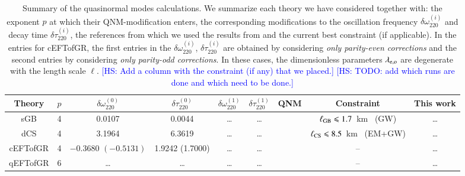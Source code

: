 \documentclass[twocolumn,prd,aps,superscriptaddress,preprintnumbers,tightenlines,showpacs,nofootinbib,eqsecnum,amsfonts,amsmath,longbibliography]{revtex4-1}
\newcommand{\hs}[1]{{\textcolor{blue}{{[HS: #1]}} }}
\begin{document}
\begin{table}[th]
\begin{tabular}{c | c c c c c c c c}
\hline
\hline
Theory & $p$ & $\delta \omega^{(0)}_{220}$ & $\delta \tau^{(0)}_{220}$ & $\delta \omega^{(1)}_{220}$ & $\delta \tau^{(1)}_{220}$ & QNM & Constraint & This work \\
\hline
sGB      & 4 & 0.0107 & 0.0044 & \dots & \dots &  \cite{Pierini:2021jxd} & $\ell_{\rm GB} \leqslant 1.7$~km~\cite{Perkins:2021mhb} (GW) & \dots \\
dCS      & 4 & 3.1964 & 6.3619 & \dots & \dots &  \cite{Wagle:2021tam}   & $\ell_{\rm CS} \leqslant 8.5$~km~\cite{Silva:2020acr} (EM+GW)  & \dots \\
cEFTofGR & 4 & $-0.3680$ $(-0.5131)$  & 1.9242 (1.7000) & \dots & \dots & \cite{Cano:2021myl} & --  & \dots \\
qEFTofGR & 6 & \dots & \dots & \dots & \dots & \cite{Cano:2021myl} & --  & \dots \\
\hline
\hline
\end{tabular}
\caption{Summary of the quasinormal modes calculations.
%
We summarize each theory we have considered together with: the exponent $p$ at
which their QNM-modification enters, the corresponding modifications to the
oscillation frequency $\delta \omega^{(i)}_{220}$ and decay time $\delta \tau^{(i)}_{220}$, the
references from which we used the results from and the current best constraint
(if applicable).
%
In the entries for cEFTofGR, the first entries in the $\delta
\omega^{(i)}_{220}$, $\delta \tau^{(i)}_{220}$ are obtained by considering
\emph{only parity-even corrections} and the second entries by considering
\emph{only parity-odd corrections}. In these cases, the dimensionless parameters
$\lambda_{\rm e,o}$ are degenerate with the length scale $\ell$.
%
\hs{Add a column with the constraint (if any) that we placed.}
\hs{TODO: add which runs are done and which need to be done.}
}
\label{tab:ref_theories_qnms}
\end{table}

\end{document}

